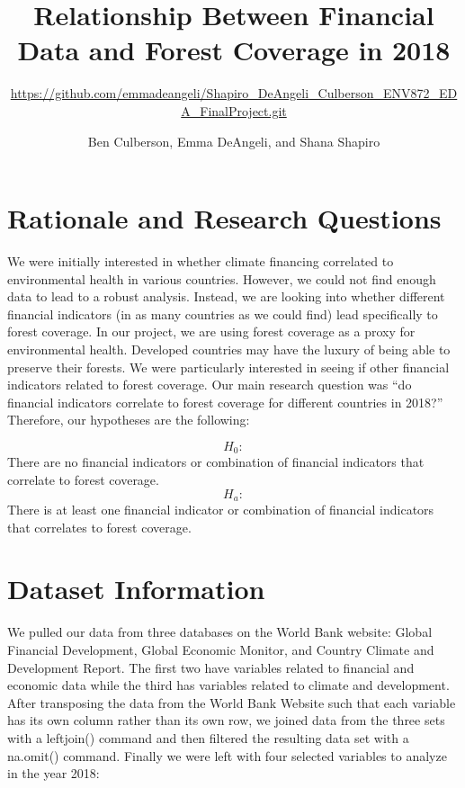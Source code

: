 \documentclass[
  12pt,
]{article}
\title{Relationship Between Financial Data and Forest Coverage in 2018}
\subtitle{\url{https://github.com/emmadeangeli/Shapiro_DeAngeli_Culberson_ENV872_EDA_FinalProject.git}}
\author{Ben Culberson, Emma DeAngeli, and Shana Shapiro}
\date{}
\begin{document}
\maketitle

\newpage
\tableofcontents 
\newpage

\hypertarget{rationale-and-research-questions}{%
\section{Rationale and Research
Questions}\label{rationale-and-research-questions}}

We were initially interested in whether climate financing correlated to
environmental health in various countries. However, we could not find
enough data to lead to a robust analysis. Instead, we are looking into
whether different financial indicators (in as many countries as we could
find) lead specifically to forest coverage. In our project, we are using
forest coverage as a proxy for environmental health. Developed countries
may have the luxury of being able to preserve their forests. We were
particularly interested in seeing if other financial indicators related
to forest coverage. Our main research question was ``do financial
indicators correlate to forest coverage for different countries in
2018?'' Therefore, our hypotheses are the following:

\[H_0:\] There are no financial indicators or combination of financial
indicators that correlate to forest coverage. \[H_a:\] There is at least
one financial indicator or combination of financial indicators that
correlates to forest coverage.

\newpage

\hypertarget{dataset-information}{%
\section{Dataset Information}\label{dataset-information}}

We pulled our data from three databases on the World Bank website:
Global Financial Development, Global Economic Monitor, and Country
Climate and Development Report. The first two have variables related to
financial and economic data while the third has variables related to
climate and development. After transposing the data from the World Bank
Website such that each variable has its own column rather than its own
row, we joined data from the three sets with a leftjoin() command and
then filtered the resulting data set with a na.omit() command. Finally
we were left with four selected variables to analyze in the year 2018:
\end{document}
